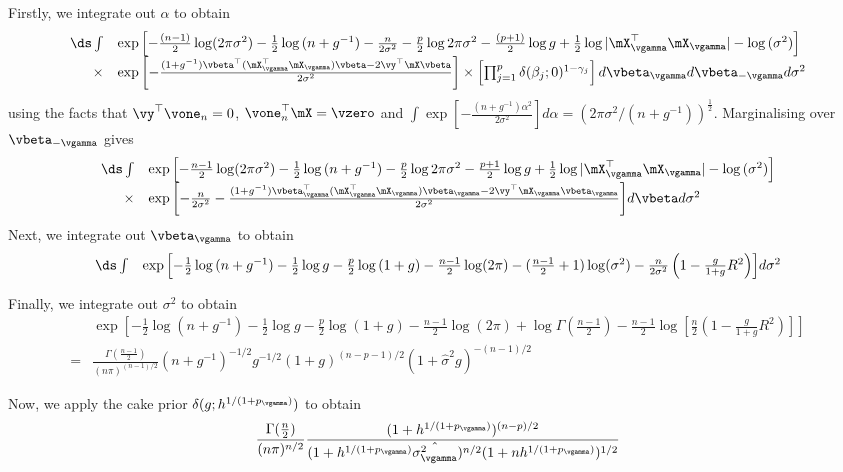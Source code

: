 \noindent Firstly, we integrate out $\alpha$ to obtain
$$
\begin{array}{rl}
		\ds \int & \exp{\left[
		-\frac{(n - 1)}{2} \log (2 \pi \sigma^2) 
		-\frac{1}{2} \log{(n + g^{-1})} 
		-\frac{n}{2 \sigma^2}
		-\frac{p}{2} \log{2\pi \sigma^2} 
		-\frac{(p + 1)}{2} \log{g} 
		+\frac{1}{2} \log{|\mX_\vgamma^\top \mX_\vgamma|}
		-\log{(\sigma^2)}
		\right]}\\
		\times&\exp{\left[
		-\frac{(1 + g^{-1})\vbeta^\top (\mX_\vgamma^\top \mX_\vgamma) \vbeta - 2 \vy^\top \mX \vbeta}{2 \sigma^{2}} 
		\right]} 
		\times \left[ \prod_{j=1}^p \delta(\beta_j; 0)^{1 - \gamma_j} \right] d \vbeta_{\vgamma} d \vbeta_{-\vgamma} d \sigma^2
\end{array}
$$
using the facts that $\vy^\top \vone_n = 0$, $\vone_n^\top \mX = \vzero$ and $\int \exp{\left[-\frac{(n + g^{-1})\alpha^2}{2 \sigma^{2}} \right]} d \alpha = (2 \pi \sigma^{2} / (n + g^{-1}))^{\frac{1}{2}}$.
Marginalising over $\vbeta_{-\vgamma}$ gives
$$
\begin{array}{rl}
		\ds \int &\exp{\left[
		-\frac{n - 1}{2} \log (2 \pi \sigma^2) 
		- \frac{1}{2} \log{(n + g^{-1})}
		-\frac{p}{2} \log{2\pi \sigma^2} 
		- \frac{p + 1}{2} \log{g}
		+ \frac{1}{2} \log{|\mX_\vgamma^\top \mX_\vgamma|} 
		-\log{(\sigma^2)}
		\right]} \\
		\times&\exp{\left[
		-\frac{n}{2 \sigma^2}
		-\frac{(1 + g^{-1})\vbeta_\vgamma^\top (\mX_\vgamma^\top \mX_\vgamma) \vbeta_\vgamma - 2\vy^\top\mX_\vgamma \vbeta_\vgamma}{2 \sigma^{2}} \right]} d \vbeta d \sigma^2
\end{array}
$$
\noindent Next, we integrate out $\vbeta_{\vgamma}$ to obtain
$$
\begin{array}{rl}
		\ds \int &\exp{\left[
		- \frac{1}{2} \log{(n + g^{-1})}
		- \frac{1}{2} \log{g}
		-\frac{p}{2} \log{(1 + g)}
		-\frac{n - 1}{2} \log (2 \pi)
		-(\frac{n - 1}{2} + 1) \log (\sigma^2) 
		-\frac{n}{2 \sigma^2} \left(1 - \frac{g}{1 + g} R^2\right)
		\right]}  d \sigma^2
\end{array}
$$

\noindent Finally, we integrate out $\sigma^2$ to obtain
\begin{equation}
\label{eq:yGivenG}
\begin{array}{rl}
		&\exp{\left[
		- \frac{1}{2} \log{(n + g^{-1})}
		- \frac{1}{2} \log{g}
		-\frac{p}{2} \log{(1 + g)}
		-\frac{n - 1}{2} \log (2 \pi)
		+\log \Gamma(\frac{n-1}{2})
		-\frac{n-1}{2}\log{[\frac{n}{2} (1 - \frac{g}{1 + g} R^2)]}
		\right]} \\
		=&\frac{\Gamma(\frac{n - 1}{2})}{(n \pi)^{(n-1)/2}}
		(n + g^{-1})^{-1/2} g^{-1/2} (1 + g)^{(n - p - 1)/2} (1 + \widehat{\sigma}^2 g)^{-(n - 1)/2}
\end{array}
\end{equation}

Now, we apply the cake prior $\delta(g; h^{1/(1 + p_\vgamma)})$ to obtain
\[
	\frac{\Gamma(\frac{n}{2})}{(n \pi)^{n/2}} \frac{(1 + h^{1/(1 + p_\vgamma)})^{(n-p)/2}}{(1 + h^{1/(1 + p_\vgamma)} \hat{\sigma^2_\vgamma})^{n/2} (1 + nh^{1/(1 + p_\vgamma)})^{1/2}}
\]
